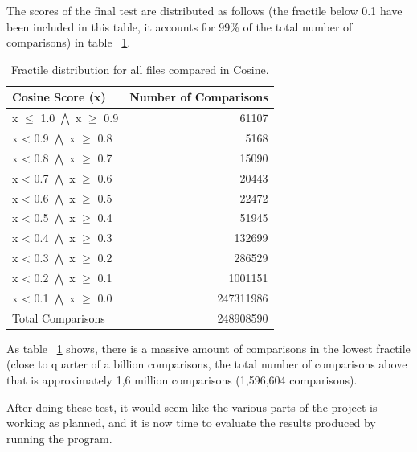 The scores of the final test are distributed as follows (the fractile below 0.1 have been included in this table, it accounts for 99\% of the total number of comparisons) in table ~\ref{AllFractiles}.

\begin{table}
\begin{center}
	\begin{tabular}{l | r}
		Cosine Score (x) & Number of Comparisons\\ \hline
		x $\leq$ 1.0 $\bigwedge$ x $\geq$ 0.9 & 61107 \\ \hline
		x < 0.9 $\bigwedge$ x $\geq$ 0.8 & 5168 \\ \hline
		x < 0.8 $\bigwedge$ x $\geq$ 0.7 & 15090 \\ \hline
		x < 0.7 $\bigwedge$ x $\geq$ 0.6 & 20443 \\ \hline
		x < 0.6 $\bigwedge$ x $\geq$ 0.5 & 22472 \\ \hline
		x < 0.5 $\bigwedge$ x $\geq$ 0.4 & 51945 \\ \hline
		x < 0.4 $\bigwedge$ x $\geq$ 0.3 & 132699 \\ \hline
		x < 0.3 $\bigwedge$ x $\geq$ 0.2 & 286529 \\ \hline
		x < 0.2 $\bigwedge$ x $\geq$ 0.1 & 1001151 \\ \hline
		x < 0.1 $\bigwedge$ x $\geq$ 0.0 & 247311986 \\ \hline	
		Total Comparisons & 248908590 \\ \hline
	\end{tabular}
\end{center}
\caption{Fractile distribution for all files compared in Cosine.} \label{AllFractiles}
\end{table}

As table ~\ref{AllFractiles} shows, there is a massive amount of comparisons in the lowest fractile (close to quarter of a billion comparisons, the total number of comparisons above that is approximately 1,6 million comparisons (1,596,604 comparisons).

After doing these test, it would seem like the various parts of the project is working as planned, and it is now time to evaluate the results produced by running the program.
